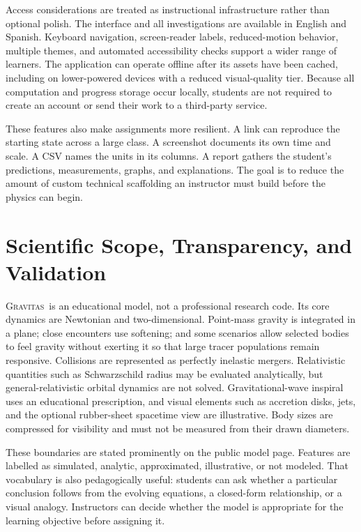 \documentclass[twocolumn]{aastex631}
\newcommand{\Gravitas}{\textsc{Gravitas}}
\begin{document}
Access considerations are treated as instructional infrastructure rather than
optional polish. The interface and all investigations are available in English
and Spanish. Keyboard navigation, screen-reader labels, reduced-motion
behavior, multiple themes, and automated accessibility checks support a wider
range of learners. The application can operate offline after its assets have
been cached, including on lower-powered devices with a reduced visual-quality
tier. Because all computation and progress storage occur locally, students are
not required to create an account or send their work to a third-party service.

These features also make assignments more resilient. A link can reproduce the
starting state across a large class. A screenshot documents its own time and
scale. A CSV names the units in its columns. A report gathers the student's
predictions, measurements, graphs, and explanations. The goal is to reduce the
amount of custom technical scaffolding an instructor must build before the
physics can begin.

\section{Scientific Scope, Transparency, and Validation}
\label{sec:scope}

\Gravitas\ is an educational model, not a professional research code. Its core
dynamics are Newtonian and two-dimensional. Point-mass gravity is integrated in
a plane; close encounters use softening; and some scenarios allow selected
bodies to feel gravity without exerting it so that large tracer populations
remain responsive. Collisions are represented as perfectly inelastic mergers.
Relativistic quantities such as Schwarzschild radius may be evaluated
analytically, but general-relativistic orbital dynamics are not solved.
Gravitational-wave inspiral uses an educational prescription, and visual
elements such as accretion disks, jets, and the optional rubber-sheet spacetime
view are illustrative. Body sizes are compressed for visibility and must not be
measured from their drawn diameters.

These boundaries are stated prominently on the public model page. Features are
labelled as simulated, analytic, approximated, illustrative, or not modeled.
That vocabulary is also pedagogically useful: students can ask whether a
particular conclusion follows from the evolving equations, a closed-form
relationship, or a visual analogy. Instructors can decide whether the model is
appropriate for the learning objective before assigning it.
\end{document}
